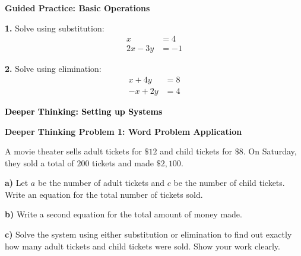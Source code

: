 \documentclass[12pt, letterpaper, fleqn]{article}
\begin{document}
\begin{tcolorbox}[colback=white!15, colframe=black, boxrule=1.5pt, arc=4mm, left=6mm, right=6mm, top=5mm, bottom=5mm]

\textbf{Guided Practice: Basic Operations}

\medskip

\noindent
\textbf{1.} Solve using substitution:
\begin{align*}
    x &= 4 \\
    2x - 3y &= -1
\end{align*}
\vspace{2.5cm}

\noindent
\textbf{2.} Solve using elimination:
\begin{align*}
    x + 4y &= 8 \\
    -x + 2y &= 4
\end{align*}
\vspace{3cm}

\end{tcolorbox}

\vspace{4mm}

\begin{tcolorbox}[colback=customteal!20]
\large\textcolor{black}{\textbf{Deeper Thinking: Setting up Systems}}
\end{tcolorbox}

\vspace{3mm}

\begin{tcolorbox}[colback=white!15, colframe=black, boxrule=1.5pt, arc=4mm, left=6mm, right=6mm, top=5mm, bottom=5mm]

\textbf{Deeper Thinking Problem 1: Word Problem Application}

\medskip

\noindent
A movie theater sells adult tickets for $\$12$ and child tickets for $\$8$. On Saturday, they sold a total of $200$ tickets and made $\$2,100$.

\vspace{5mm}

\noindent
\textbf{a)} Let $a$ be the number of adult tickets and $c$ be the number of child tickets. Write an equation for the total number of tickets sold.

\vspace{1.5cm}

\noindent
\textbf{b)} Write a second equation for the total amount of money made.

\vspace{1.5cm}

\noindent
\textbf{c)} Solve the system using either substitution or elimination to find out exactly how many adult tickets and child tickets were sold. Show your work clearly.

\vspace{5cm}

\end{tcolorbox}
\end{document}
